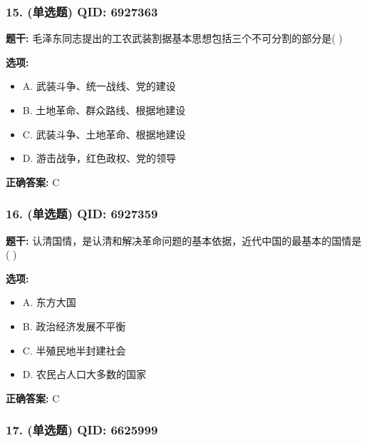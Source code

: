 \documentclass[12pt,UTF8]{ctexart}
\begin{document}
\subsubsection*{15. (单选题) \small QID: 6927363}

\textbf{题干:}
毛泽东同志提出的工农武装割据基本思想包括三个不可分割的部分是(   )

\textbf{选项:}
\begin{itemize}[leftmargin=*]

  \item A. 武装斗争、统一战线、党的建设

  \item B. 土地革命、群众路线、根据地建设

  \item C. 武装斗争、土地革命、根据地建设

  \item D. 游击战争，红色政权、党的领导

\end{itemize}

\textbf{正确答案:}
C

\vspace{0.3em}\hrulefill\vspace{0.7em}

\subsubsection*{16. (单选题) \small QID: 6927359}

\textbf{题干:}
认清国情，是认清和解决革命问题的基本依据，近代中国的最基本的国情是(   )

\textbf{选项:}
\begin{itemize}[leftmargin=*]

  \item A. 东方大国

  \item B. 政治经济发展不平衡

  \item C. 半殖民地半封建社会

  \item D. 农民占人口大多数的国家

\end{itemize}

\textbf{正确答案:}
C

\vspace{0.3em}\hrulefill\vspace{0.7em}

\subsubsection*{17. (单选题) \small QID: 6625999}
\end{document}
